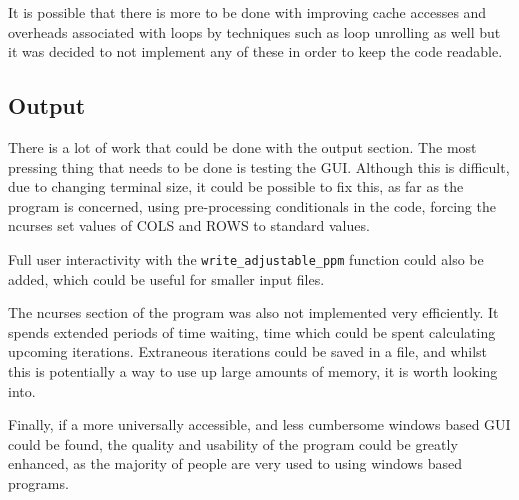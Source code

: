   It is possible that there is more to be done with improving cache accesses and overheads associated with loops by techniques such as loop unrolling as well but it was decided to not implement any of these in order to keep the code readable.
\subsection{Output}
	There is a lot of work that could be done with the output section.
	The most pressing thing that needs to be done is testing the GUI.
	Although this is difficult, due to changing terminal size, it could be possible to fix this, as far as the program is concerned, using
	pre-processing conditionals in the code, forcing the ncurses set values of COLS and ROWS to standard values.
	
	Full user interactivity with the \texttt{write\_adjustable\_ppm} function could also be added, which could be useful for smaller input files.

	The ncurses section of the program was also not implemented very efficiently.
	It spends extended periods of time waiting, time which could be spent calculating upcoming iterations.
	Extraneous iterations could be saved in a file, and whilst this is potentially a way to use up large amounts of memory, it is worth looking into.
	
	Finally, if a more universally accessible, and less cumbersome windows based GUI could be found, the quality and usability of the program could be greatly enhanced, as the majority of people are very used to using windows based programs.

